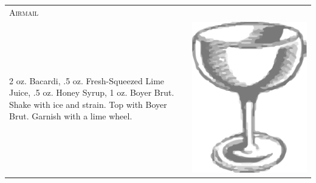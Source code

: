 \documentclass{article}
\begin{document}
\begin{multicols}{2}
\begin{tabular}{p{2in} p{0.5in}}
\multicolumn{2}{p{3in}}{\centering\Huge\textsc{Airmail}} \\ 
  \vspace{-0.1in}2 oz. Bacardi, .5 oz. Fresh-Squeezed Lime Juice, .5 oz. Honey Syrup, 1 oz. Boyer Brut. Shake with ice and strain. Top with Boyer Brut. Garnish with a lime wheel. &
  \vspace{-0.1in} \includegraphics{egg_coupe.png}
\end{tabular}


\end{multicols}
\end{document}
